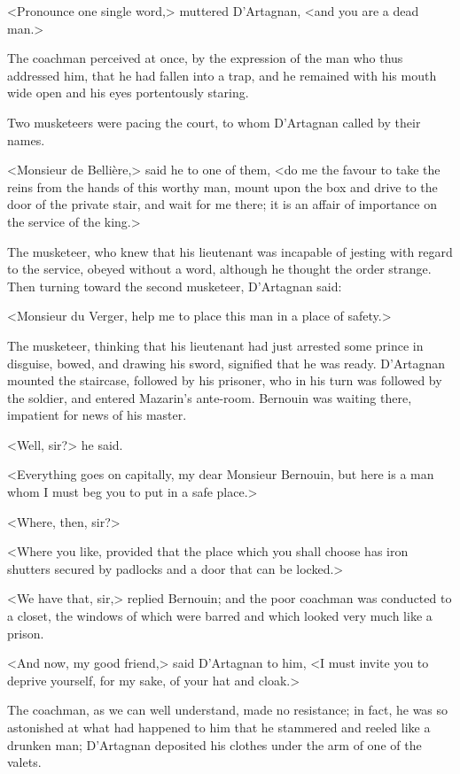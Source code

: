 <Pronounce one single word,> muttered D'Artagnan, <and you are a dead man.>

The coachman perceived at once, by the expression of the man who thus addressed him, that he had fallen into a trap, and he remained with his mouth wide open and his eyes portentously staring.

Two musketeers were pacing the court, to whom D'Artagnan called by their names.

<Monsieur de Bellière,> said he to one of them, <do me the favour to take the reins from the hands of this worthy man, mount upon the box and drive to the door of the private stair, and wait for me there; it is an affair of importance on the service of the king.>

The musketeer, who knew that his lieutenant was incapable of jesting with regard to the service, obeyed without a word, although he thought the order strange. Then turning toward the second musketeer, D'Artagnan said:

<Monsieur du Verger, help me to place this man in a place of safety.>

The musketeer, thinking that his lieutenant had just arrested some prince in disguise, bowed, and drawing his sword, signified that he was ready. D'Artagnan mounted the staircase, followed by his prisoner, who in his turn was followed by the soldier, and entered Mazarin's ante-room. Bernouin was waiting there, impatient for news of his master.

<Well, sir?> he said.

<Everything goes on capitally, my dear Monsieur Bernouin, but here is a man whom I must beg you to put in a safe place.>

<Where, then, sir?>

<Where you like, provided that the place which you shall choose has iron shutters secured by padlocks and a door that can be locked.>

<We have that, sir,> replied Bernouin; and the poor coachman was conducted to a closet, the windows of which were barred and which looked very much like a prison.

<And now, my good friend,> said D'Artagnan to him, <I must invite you to deprive yourself, for my sake, of your hat and cloak.>

The coachman, as we can well understand, made no resistance; in fact, he was so astonished at what had happened to him that he stammered and reeled like a drunken man; D'Artagnan deposited his clothes under the arm of one of the valets.

